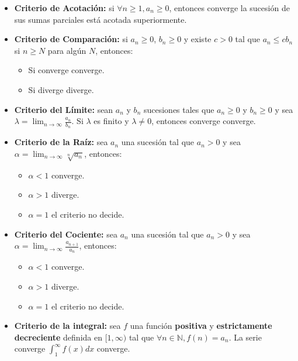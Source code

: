 \begin{itemize}
\item
  \textbf{Criterio de Acotación:} si \(\forall n \geq 1, a_n \geq 0\),
  entonces  converge \implica la sucesión de sus sumas
  parciales está acotada superiormente.
\item
  \textbf{Criterio de Comparación:} si \(a_n \geq 0\), \(b_n \geq 0\) y
  existe \(c > 0\) tal que \(a_n \leq c b_n\) si \(n \geq N\) para algún
  \(N\), entonces:

  \begin{itemize}
  \tightlist
  \item
    Si  converge \implica {} converge.
  \item
    Si  diverge \implica {} diverge.
  \end{itemize}
\item
  \textbf{Criterio del Límite:} sean \(a_n\) y \(b_n\) sucesiones tales
  que \(a_n \geq 0\) y \(b_n \geq 0\) y sea
  \(\lambda = \ensuremath{\lim_{n \to \infty} \frac{a_n}{b_n}}\). Si
  \(\lambda\) es finito y \(\lambda \neq 0\), entonces 
  converge \sii {} converge.
\item
  \textbf{Criterio de la Raíz:} sea \(a_n\) una sucesión tal que
  \(a_n > 0\) y sea
  \(\alpha = \ensuremath{\lim_{n \to \infty} \sqrt[n]{a_n}}\), entonces:

  \begin{itemize}
  \tightlist
  \item
    \(\alpha < 1\) \implica {} converge.
  \item
    \(\alpha > 1\) \implica {} diverge.
  \item
    \(\alpha = 1\) \implica el criterio no decide.
  \end{itemize}
\item
  \textbf{Criterio del Cociente:} sea \(a_n\) una sucesión tal que
  \(a_n > 0\) y sea
  \(\alpha = \ensuremath{\lim_{n \to \infty} \frac{a_{n+1}}{a_n}}\),
  entonces:

  \begin{itemize}
  \tightlist
  \item
    \(\alpha < 1\) \implica {} converge.
  \item
    \(\alpha > 1\) \implica {} diverge.
  \item
    \(\alpha = 1\) \implica el criterio no decide.
  \end{itemize}
\item
  \textbf{Criterio de la integral:} sea \(f\) una función
  \textbf{positiva} y \textbf{estrictamente decreciente} definida en
  \([1, \infty)\) tal que
  \(\forall n \in \ensuremath{\mathbb{N}}, f(n) = a_n\). La serie
   converge \sii \(\int_1^\infty f(x)dx\) converge.
\end{itemize}

